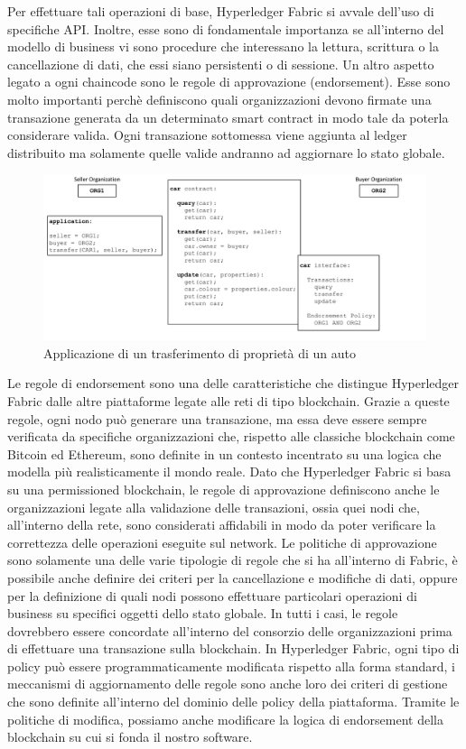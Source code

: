 Per effettuare tali operazioni di base, Hyperledger Fabric si avvale dell'uso di specifiche API. Inoltre, esse sono di fondamentale importanza se all'interno del modello di business vi sono procedure che interessano la lettura, scrittura o la cancellazione di dati, che essi siano persistenti o di sessione.
Un altro aspetto legato a ogni chaincode sono le regole di approvazione (endorsement). Esse sono molto importanti perchè definiscono quali organizzazioni devono firmate una transazione generata da un determinato smart contract in modo tale da poterla considerare valida. Ogni transazione sottomessa viene aggiunta al ledger distribuito ma solamente quelle valide andranno ad aggiornare lo stato globale.
\begin{figure}[h]
    \centering
    \includegraphics[width=1\textwidth]{img/endorsement.png}
    \caption{Applicazione di un trasferimento di proprietà di un auto}
    \label{fig:endorsement-policy}
\end{figure}
Le regole di endorsement sono una delle caratteristiche che distingue Hyperledger Fabric dalle altre piattaforme legate alle reti di tipo blockchain. Grazie a queste regole, ogni nodo può generare una transazione, ma essa deve essere sempre verificata da specifiche organizzazioni che, rispetto alle classiche blockchain come Bitcoin ed Ethereum, sono definite in un contesto incentrato su una logica che modella più realisticamente il mondo reale. Dato che Hyperledger Fabric si basa su una permissioned blockchain, le regole di approvazione definiscono anche le organizzazioni legate alla validazione delle transazioni, ossia quei nodi che, all'interno della rete, sono considerati affidabili in modo da poter verificare la correttezza delle operazioni eseguite sul network. Le politiche di approvazione sono solamente una delle varie tipologie di regole che si ha all'interno di Fabric, è possibile anche definire dei criteri per la cancellazione e modifiche di dati, oppure per la definizione di quali nodi possono effettuare particolari operazioni di business su specifici oggetti dello stato globale. In tutti i casi, le regole dovrebbero essere concordate all'interno del consorzio delle organizzazioni prima di effettuare una transazione sulla blockchain. In Hyperledger Fabric, ogni tipo di policy può essere programmaticamente modificata rispetto alla forma standard, i meccanismi di aggiornamento delle regole sono anche loro dei criteri di gestione che sono definite all'interno del dominio delle policy della piattaforma. Tramite le politiche di modifica, possiamo anche modificare la logica di endorsement della blockchain su cui si fonda il nostro software. 
